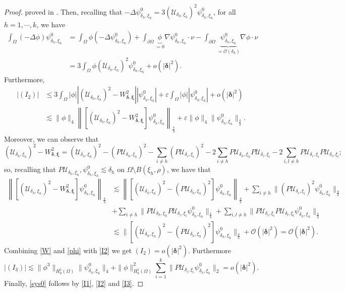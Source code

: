 \documentclass[11pt,a4paper]{amsart}
\newcommand{\e}{\varepsilon}
\renewcommand{\d }{\delta }
\newcommand{\Ui}{{\mathcal{U}_{\delta_i, \xi_i}}}
\newcommand{\Ul}{{\mathcal{U}_{\delta_l, \xi_l}}}
\newcommand{\Uh}{{\mathcal{U}_{\delta_h, \xi_h}}}
\theoremstyle{definition}
\renewcommand{\(}{\left(}
\renewcommand{\)}{\right)}
\begin{document}
\begin{proof}
proved in \cite{R}. Then, recalling that $-\Delta \psi^0_{\d_h, \xi_h} = 3(\Uh)^{2} \psi^0_{\d_h, \xi_h}$, for all $h=1, \cdots, k$, we have
\begin{equation*}
\begin{aligned}
\int_{\Omega} (-\Delta \phi) \psi^0_{\d_h, \xi_h} & = \int_{\Omega} \phi (-\Delta \psi^0_{\d_h, \xi_h}) + \int_{\partial \Omega} \underbrace{\phi}_{=0} \nabla \psi^0_{\d_h, \xi_h} \cdot \nu - \int_{\partial \Omega} \underbrace{\psi^0_{\d_h, \xi_h}}_{=\mathcal{O}(\d_h)} \nabla \phi \cdot \nu \\& = 3\int_{\Omega} \phi (\Uh)^{2} \psi^0_{\d_h, \xi_h} + o(|\pmb \d|^{2}).
\end{aligned}
\end{equation*}
Furthermore, 
\begin{equation}\label{I2}
\begin{aligned}
|(I_2)| & \leq 3 \int_{\Omega} |\phi| | (\Uh)^{2} -  W_{\pmb{\d}, \pmb{\xi}}^2| |\psi^{0}_{\d_h, \xi_h}| + \e \int_{\Omega} |\phi| | \psi^{0}_{\d_h, \xi_h}| + o(|\pmb \d|^{2})
\\& \lesssim \| \phi \|_{4} \left \|\left[ (\Uh)^{2} -  W_{\pmb{\d}, \pmb{\xi}}^2\right] \psi^{0}_{\d_h, \xi_h} \right \|_{\frac{4}{3}} + \e \|\phi\|_{4} \|\psi^{0}_{\d_h, \xi_h}\|_{\frac{4}{3}}.
\end{aligned}
\end{equation}
Moreover, we can observe that
\begin{equation*}
(\Uh)^{2} -  W_{\pmb{\d}, \pmb{\xi}}^2 = (\Uh)^{2} - (P\Uh)^{2} - \sum_{i \neq h} (P\Ui) ^{2} - 2 \sum_{i \neq h} P\Uh P\Ui - 2 \sum_{i,l \neq h} P\Ui P\Ul;
\end{equation*}
so, recalling that $P\Uh, \psi^{0}_{\d_h, \xi_h} \lesssim \d_h$ on $\Omega \setminus B(\xi_h, \rho)$, we have that
\begin{equation}\label{W}
\begin{aligned}
\left \| \left[ (\Uh)^{2} -  W_{\pmb{\d}, \pmb{\xi}}^2 \right] \psi^{0}_{\d_h, \xi_h} \right \|_{\frac{4}{3}} & \lesssim \left \| \left[ (\Uh)^{2} - (P\Uh)^{2} \right] \psi^{0}_{\d_h, \xi_h} \right \|_{\frac{4}{3}} + \sum_{i \neq h} \| (P\Ui)^{2} \psi^{0}_{\d_h, \xi_h} \|_{\frac{4}{3}} \\& + \sum_{i \neq h} \| P\Uh P\Ui \psi^{0}_{\d_h, \xi_h}\|_{\frac{4}{3}} + \sum_{i,l \neq h} \| P\Ui P\Ul \psi^{0}_{\d_h, \xi_h}\|_{\frac{4}{3}} \\& \lesssim \| \left[ (\Uh)^{2} - (P\Uh)^{2} \right] \psi^{0}_{\d_h, \xi_h}\|_{\frac{4}{3}} + \mathcal{O}(|\pmb \d|^{2}) =  \mathcal{O}(|\pmb \d|^{2}).
\end{aligned}
\end{equation}
Combining \eqref{W} and \eqref{phi} with \eqref{I2} we get $(I_2)=o(|\pmb \d|^{2})$.
Furthermore
\begin{equation}\label{I3}
|(I_3)| \lesssim \| \phi^{3} \|_{H^1_0(\Omega)} \| \psi^0_{\d_h, \xi_h} \|_{4} +  \| \phi \|_{H^1_0(\Omega)}^{2} \sum_{i=1}^{k} \| P\Ui \psi^0_{\d_h, \xi_h} \|_{2} = o(|\pmb \d|^{2}).
\end{equation}
Finally, \eqref{sys0} follows by \eqref{I1}, \eqref{I2} and \eqref{I3}.
\end{proof}
\end{document}
